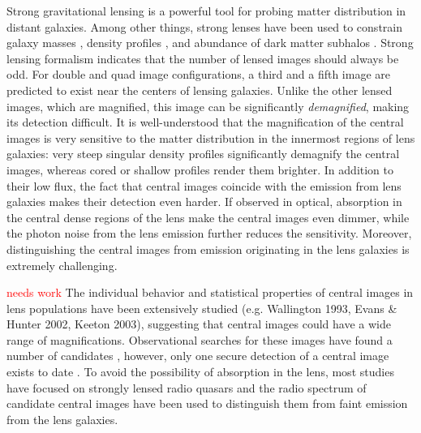\documentclass[chicago]{emulateapj}
\newcommand{\red}{\textcolor{red}}
\begin{document}
Strong gravitational lensing is a powerful tool for probing matter distribution in distant galaxies. Among other things, strong lenses have been used to constrain galaxy masses  \citep[e.g.][]{}, density profiles \citep[e.g.][]{}, and abundance of dark matter subhalos \citep[e.g.][]{}.
Strong lensing formalism indicates that the number of lensed images should always be odd. For double and quad image configurations, a third and a fifth image are predicted to exist near the centers of lensing galaxies. Unlike the other lensed images, which are magnified, this image can be significantly \emph{demagnified}, making its detection difficult.  It is well-understood that the magnification of the central images is very sensitive to the matter distribution in the innermost regions of lens galaxies: very steep singular density profiles significantly demagnify the central images, whereas cored or shallow profiles render them brighter. %
In addition to their low flux, the fact that central images coincide with the emission from lens galaxies makes their detection even harder.
If observed in optical, absorption in the central dense regions of the lens make the central images even dimmer, while the photon noise from the lens emission further reduces the sensitivity. Moreover, distinguishing the central images from emission originating in the lens galaxies is extremely  challenging.






\red{needs work}
The individual behavior \citep{} and statistical properties of central images in lens populations have been extensively studied (e.g. Wallington 1993, Evans \& Hunter 2002, Keeton 2003),  suggesting that central images could have a wide range of magnifications. 
Observational searches for these images have found a number of candidates \citep[e.g.][]{}, however, only one secure detection of a central image exists to date \citep{winn:2004}.
To avoid the possibility of absorption in the lens, most studies have focused on strongly lensed radio quasars and the radio spectrum of candidate central images have been used to distinguish them from faint emission from the lens galaxies.
\end{document}
